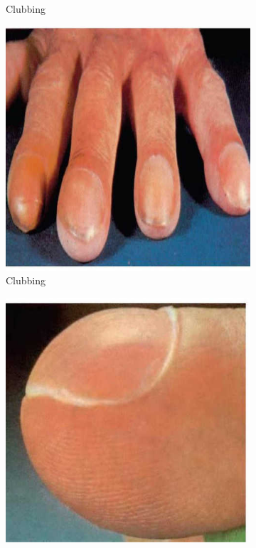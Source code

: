 \documentclass[a4paper,12pt]{book}
\begin{document}
{\begin{figure}[h]
\begin{subfigure}[t]{.23\textwidth}
																	\caption{Clubbing}
																	\label{Clubbing1}
																\end{subfigure}
																\hspace{\fill}
																\begin{subfigure}[t]{.23\textwidth}
																	\centering
																	\includegraphics[width=\textwidth]{./clinicalPhysioPic/clubbing3-1.jpg}
																	\caption{Clubbing}
																	\label{Clubbing2}
																\end{subfigure}
																\hspace{\fill}
																\begin{subfigure}[t]{.23\textwidth}
																	\centering
																	\includegraphics[width=\textwidth]{./clinicalPhysioPic/clubbing3-2.jpg}

\end{subfigure}
\end{figure}}
\end{document}
